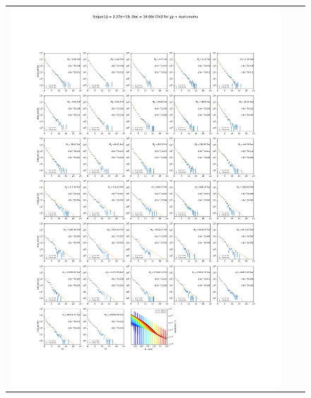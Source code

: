 \begin{figure}[t]
{\begin{tabular}{ccc}
            \includegraphics[clip, trim=22.1cm 6.5cm 19.5cm 56.5cm, scale=0.55]{figures/ic_DM/dm_plots/Segue1_numunumu_chi2_Masspanel_2024-03-23.pdf} &

\end{tabular}}
\end{figure}
